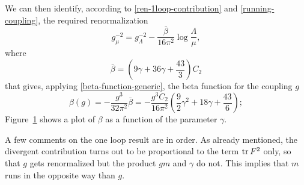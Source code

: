 We can then identify, according to \eqref{ren-1loop-contribution} and \eqref{running-coupling}, the required renormalization
\begin{equation}
g^{- 2 }_\mu = g^{- 2 }_\Lambda  - \frac{ \bar \beta }{ 16 \pi^2 } \log \frac{\Lambda}{\mu},
\end{equation}
where
\begin{equation}
\bar \beta  = \left( 9 \gamma + 36 \gamma + \frac{43}{3}\right)C_2
\end{equation}
that gives, applying \eqref{beta-function-generic}, the beta function for the \ym{} coupling $g$
\begin{equation}\label{beta-hd-ym}
\beta(g)  = - \frac{g^3}{32\pi^2}\bar \beta =  - \frac{g^3 C_2}{16 \pi^2} \left( \frac{9}{2} \gamma^2 + 18 \gamma + \frac{43}{6}\right);
\end{equation}
Figure~\ref{FIG_plot-beta} shows a plot of $\beta$ as a function of the parameter $\gamma$.


\begin{figure*}[!ht]
\centering
{}
 \label{FIG_plot-beta}
\end{figure*}


A few comments on the one loop result are in order. As already mentioned, the divergent contribution turns out to be proportional to the term $\operatorname{tr} F^2$ only, so that $g$ gets renormalized but the product $gm$ and $\gamma$ do not. This implies that $m$ runs in the opposite way than $g$.

